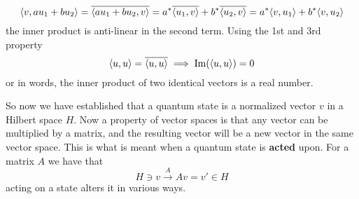 \begin{equation}
\langle v,au_1 + bu_2 \rangle = \overline{\langle au_1 + bu_2,v \rangle} = a^{*}\overline{\langle u_1,v \rangle} + b^{*}\overline{\langle u_2,v \rangle} =   a^{*}\langle v,u_1 \rangle + b^{*}\langle v,u_2 \rangle
\end{equation} 
the inner product is anti-linear in the second term.
Using the 1st and 3rd property 
\begin{equation}
\langle u,u \rangle = \overline{\langle u,u \rangle} \implies \text{Im}(\langle u,u \rangle) = 0
\end{equation}
or in words, the inner product of two identical vectors is a real number.

So now we have established that a quantum state is a normalized vector $v$ in a Hilbert space $H$. Now a property of vector spaces is that any vector can be multiplied by a matrix, and the resulting vector will be a new vector in the same vector space. This is what is meant when a quantum state is \textbf{acted} upon. For a matrix $A$ we have that 
\begin{equation}
H \ni v  \xrightarrow{A} Av = v' \in H
\end{equation}
acting on a state alters it in various ways.

